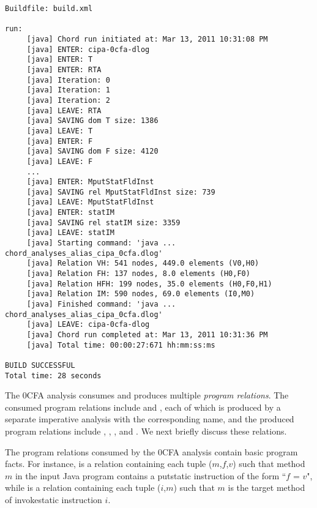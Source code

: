 \begin{framed}
{\small
\begin{verbatim}
Buildfile: build.xml

run:
     [java] Chord run initiated at: Mar 13, 2011 10:31:08 PM
     [java] ENTER: cipa-0cfa-dlog
     [java] ENTER: T
     [java] ENTER: RTA
     [java] Iteration: 0
     [java] Iteration: 1
     [java] Iteration: 2
     [java] LEAVE: RTA
     [java] SAVING dom T size: 1386
     [java] LEAVE: T
     [java] ENTER: F
     [java] SAVING dom F size: 4120
     [java] LEAVE: F
     ...
     [java] ENTER: MputStatFldInst
     [java] SAVING rel MputStatFldInst size: 739
     [java] LEAVE: MputStatFldInst
     [java] ENTER: statIM
     [java] SAVING rel statIM size: 3359
     [java] LEAVE: statIM
     [java] Starting command: 'java ... chord_analyses_alias_cipa_0cfa.dlog'
     [java] Relation VH: 541 nodes, 449.0 elements (V0,H0)
     [java] Relation FH: 137 nodes, 8.0 elements (H0,F0)
     [java] Relation HFH: 199 nodes, 35.0 elements (H0,F0,H1)
     [java] Relation IM: 590 nodes, 69.0 elements (I0,M0)
     [java] Finished command: 'java ... chord_analyses_alias_cipa_0cfa.dlog'
     [java] LEAVE: cipa-0cfa-dlog
     [java] Chord run completed at: Mar 13, 2011 10:31:36 PM
     [java] Total time: 00:00:27:671 hh:mm:ss:ms

BUILD SUCCESSFUL
Total time: 28 seconds
\end{verbatim}
}
\end{framed}

The 0CFA analysis consumes and produces multiple {\it program
relations}.  The consumed program relations include 
and , each of which is produced by a separate imperative analysis with
the corresponding name, and the produced program relations include
, , , and .  We next briefly
discuss these relations.

The program relations consumed by the 0CFA analysis contain basic program facts.  For instance,
 is a relation containing each tuple ($m$,$f$,$v$) such that method $m$ in the input Java
program contains a putstatic instruction of the form ``$f$ = $v$",
while  is a relation containing each tuple ($i$,$m$) such that $m$
is the target method of invokestatic instruction $i$.

